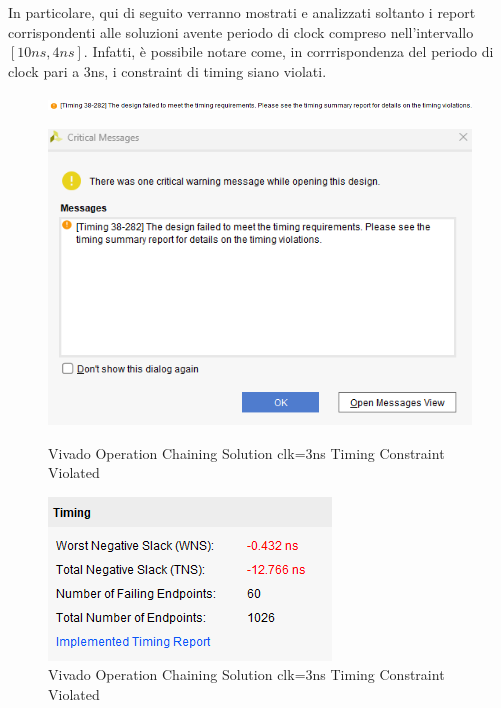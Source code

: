 In particolare, qui di seguito verranno mostrati e analizzati soltanto i report corrispondenti alle soluzioni avente periodo di clock compreso nell'intervallo $[10ns,4ns]$. Infatti, è possibile notare come, in corrrispondenza del periodo di clock pari a 3ns, i constraint di timing siano violati.
\begin{figure}[H]
    \centering
    \includegraphics[width=\textwidth]{solutions/operation_chaining/3ns/timingrequirement.png}
    \label{fig:left}
\end{figure}
\begin{figure}[H]
    \centering
    \begin{minipage}[t]{0.45\textwidth}
        \centering
        \includegraphics[width=\textwidth]{solutions/operation_chaining/3ns/critical.png}
    \caption{Vivado Operation Chaining Solution clk=3ns Timing Constraint Violated}
        \label{fig:left}
    \end{minipage}
    \hfill
    \begin{minipage}[t]{0.45\textwidth}
        \centering
        \includegraphics[width=\textwidth]{solutions/operation_chaining/3ns/wns.png}
    \caption{Vivado Operation Chaining Solution clk=3ns Timing Constraint Violated}
        \label{fig:right}
    \end{minipage}
\end{figure}

